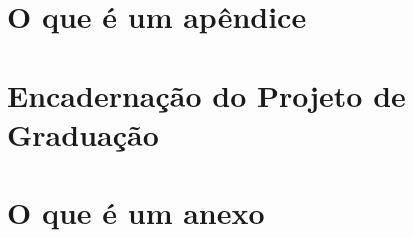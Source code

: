 \documentclass[a4paper,12pt,oneside,openany]{book}
\begin{document}
\frontmatter
\thispagestyle{empty}






\tableofcontents
\listoffigures
\listoftables

\mainmatter
\cleardoublepage






\normalsize
\cleardoublepage
{}





\appendix


\chapter{O que é um apêndice}
\label{ApendiceA}



\chapter{Encadernação do Projeto de Graduação}
\label{ApendiceB}



\chapter{O que é um anexo}
\label{ApendiceC}


\backmatter
\end{document}
